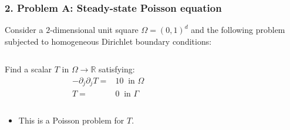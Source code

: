 \begin{frame}
	\frametitle{\textbf{2. Problem A: Steady-state Poisson equation}}
    
    Consider a $2$-dimensional unit square $\Omega = (0,1)^d$ and the following problem subjected to homogeneous Dirichlet boundary conditions: 
    \vspace{0.5cm}
    \begin{columns}[c]
    \begin{column}{0.5\textwidth}
    \begin{framed}
    Find a scalar $T$ in $\Omega \rightarrow \mathbb{R}$ satisfying:
    \begin{align*}
        -\partial_j \partial_j T =& 10 \ \textrm{ in } \Omega\\
         T =& 0 \ \textrm{ in } \Gamma
    \end{align*}
    \end{framed}
    \end{column}
    \begin{column}{0.4\textwidth}
    \vspace*{-\baselineskip}
    \begin{center}
    	
    \end{center}
    \end{column}
    \end{columns}
    
    \vspace{0.4cm}
    \begin{itemize}
        \item This is a Poisson problem for $T$. 
    \end{itemize}    

\end{frame}


